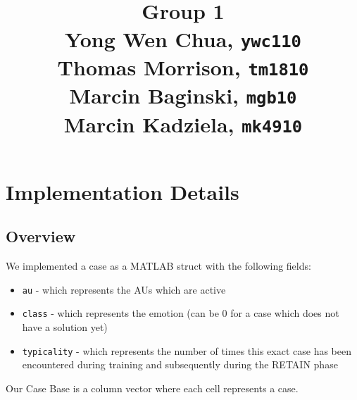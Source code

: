 \documentclass[a4paper]{article}
\title{
\vspace{2in}
\textmd{\textbf{\hmwkTitle}}\\
\vspace{3in}
\textbf{Group 1}\\
Yong Wen Chua, \texttt{ywc110}\\
Thomas Morrison, \texttt{tm1810}\\
Marcin Baginski, \texttt{mgb10}\\
Marcin Kadziela, \texttt{mk4910}
}
\date{} %
\begin{document}
\maketitle



\newpage
\tableofcontents
\newpage


\section{Implementation Details}

\subsection{Overview}
We implemented a case as a MATLAB struct with the following fields:
\begin{itemize} \itemsep0pt \parskip0pt 
\item \texttt{au} - which represents the AUs which are active
\item \texttt{class} - which represents the emotion (can be 0 for a case which does not have a solution yet)
\item \texttt{typicality} - which represents the number of times this exact case has been encountered during training and subsequently during the RETAIN phase
\end{itemize}
Our Case Base is a column vector where each cell represents a case. \medskip
\end{document}

